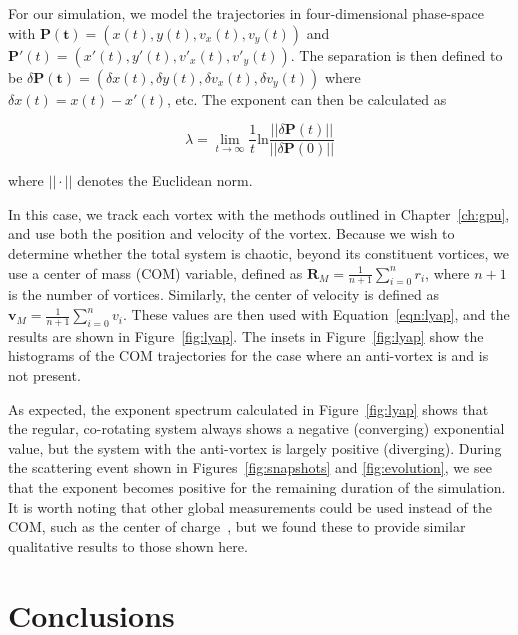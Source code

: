 For our simulation, we model the trajectories in four-dimensional phase-space with $\mathbf{P(t)} = (x(t), y(t), v_x(t), v_y(t))$ and $\mathbf{P}'(t) = (x'(t), y'(t), v'_x(t), v'_y(t))$.
The separation is then defined to be $\delta \mathbf{P(t)} = (\delta x(t), \delta y(t), \delta v_x(t), \delta v_y(t))$ where $\delta x(t) = x(t) - x'(t)$, etc.
The exponent can then be calculated as

\begin{equation}
\lambda = \lim_{t\to\infty}\frac{1}{t}\text{ln}\frac{||\delta\textbf{P}(t)||}{||\delta\textbf{P}(0)||}
\label{eqn:lyap}
\end{equation}

\noindent where $||\cdot||$ denotes the Euclidean norm.

In this case, we track each vortex with the methods outlined in Chapter~\ref{ch:gpu}, and use both the position and velocity of the vortex.
Because we wish to determine whether the total system is chaotic, beyond its constituent vortices, we use a center of mass (COM) variable, defined as $\mathbf{R}_M = \frac{1}{n+1}\sum_{i=0}^nr_i$, where $n+1$ is the number of vortices.
Similarly, the center of velocity is defined as $\mathbf{v}_M = \frac{1}{n+1}\sum_{i=0}^nv_i$.
These values are then used with Equation~\eqref{eqn:lyap}, and the results are shown in Figure~\ref{fig:lyap}.
The insets in Figure~\ref{fig:lyap} show the histograms of the COM trajectories for the case where an anti-vortex is and is not present.

As expected, the exponent spectrum calculated in Figure~\ref{fig:lyap} shows that the regular, co-rotating system always shows a negative (converging) exponential value, but the system with the anti-vortex is largely positive (diverging).
During the scattering event shown in Figures~\ref{fig:snapshots} and \ref{fig:evolution}, we see that the exponent becomes positive for the remaining duration of the simulation.
It is worth noting that other global measurements could be used instead of the COM, such as the center of charge~\cite{kyriakopoulos2014}, but we found these to provide similar qualitative results to those shown here.


\section{Conclusions}

